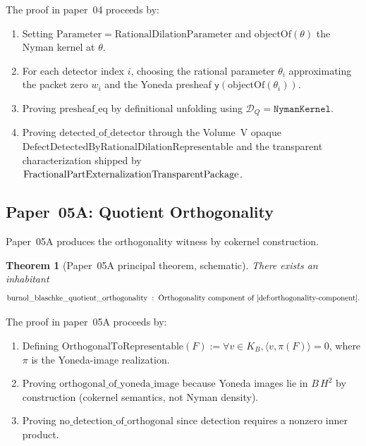 \documentclass[12pt]{article}
\theoremstyle{plain}
\newtheorem{theorem}{Theorem}[section]
\theoremstyle{definition}
\theoremstyle{remark}
\newcommand{\HardyTwo}{H^{2}}
\newcommand{\KB}{K_{B}}
\newcommand{\BHardy}{B\,\HardyTwo}
\newcommand{\DQ}{\mathcal{D}_{Q}}
\newcommand{\Yon}{\mathsf{y}}
\begin{document}
The proof in paper~04 proceeds by:
\begin{enumerate}
  \item Setting \(\mathrm{Parameter} = \mathrm{RationalDilationParameter}\)
        and \(\mathrm{objectOf}(\theta)\) the Nyman kernel at \(\theta\).
  \item For each detector index \(i\), choosing the rational parameter
        \(\theta_{i}\) approximating the packet zero \(w_{i}\) and the
        Yoneda presheaf \(\Yon(\mathrm{objectOf}(\theta_{i}))\).
  \item Proving \(\mathrm{presheaf\_eq}\) by definitional unfolding using
        \(\DQ = \mathtt{NymanKernel}\).
  \item Proving \(\mathrm{detected\_of\_detector}\) through the
        Volume~V opaque
        \(\mathrm{DefectDetectedByRationalDilationRepresentable}\) and
        the transparent characterization shipped by
        \(\mathrm{Frac\-tio\-nal\-Part\-Externalization\-Trans\-parent\-Pa\-cka\-ge}\).
\end{enumerate}

\subsection{Paper~05A: Quotient Orthogonality}
\label{sec:paper05a-review}

Paper~05A produces the orthogonality witness by cokernel construction.

\begin{theorem}[Paper~05A principal theorem, schematic]
\label{thm:paper05a}
There exists an inhabitant
\[
  \mathrm{burnol\_blaschke\_quotient\_orthogonality}
  \;:\; \text{Orthogonality component of \Cref{def:orthogonality-component}}.
\]
\end{theorem}

The proof in paper~05A proceeds by:
\begin{enumerate}
  \item Defining
        \(\mathrm{OrthogonalToRepresentable}(F) := \forall v \in \KB,
        \langle v, \pi(F)\rangle = 0\), where \(\pi\) is the
        Yoneda-image realization.
  \item Proving \(\mathrm{orthogonal\_of\_yoneda\_image}\) because
        Yoneda images lie in \(\BHardy\) by construction (cokernel
        semantics, not Nyman density).
  \item Proving \(\mathrm{no\_detection\_of\_orthogonal}\) since
        detection requires a nonzero inner product.
\end{enumerate}
\end{document}
